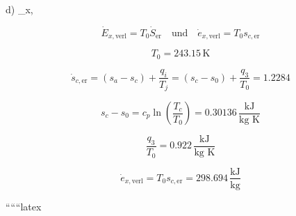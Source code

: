 d) \quad {}_{x, }

\[
\dot{E}_{x, \text{verl}} = T_0 \dot{S}_{\text{er}} \quad \text{und} \quad \dot{e}_{x, \text{verl}} = T_0 s_{c, \text{er}}
\]

\[
T_0 = 243.15 \, \text{K}
\]

\[
\dot{s}_{c, \text{er}} = (s_a - s_c) + \frac{q_i}{T_j} = (s_c - s_0) + \frac{q_3}{T_0} = 1.2284
\]

\[
s_c - s_0 = c_p \ln \left( \frac{T_c}{T_0} \right) = 0.30136 \, \frac{\text{kJ}}{\text{kg K}}
\]

\[
\frac{q_3}{T_0} = 0.922 \, \frac{\text{kJ}}{\text{kg K}}
\]

\[
\dot{e}_{x, \text{verl}} = T_0 s_{c, \text{er}} = 298.694 \, \frac{\text{kJ}}{\text{kg}}
\]

``````latex